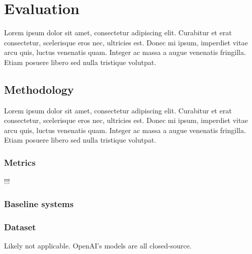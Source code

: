 \chapter{Evaluation}
Lorem ipsum dolor sit amet, consectetur adipiscing elit. Curabitur et erat consectetur, 
scelerisque eros nec, ultricies est. Donec mi ipsum, imperdiet vitae arcu quis, luctus venenatis quam. 
Integer ac massa a augue venenatis fringilla. Etiam posuere libero sed nulla tristique volutpat.

\section{Methodology}
Lorem ipsum dolor sit amet, consectetur adipiscing elit. Curabitur et erat consectetur, 
scelerisque eros nec, ultricies est. Donec mi ipsum, imperdiet vitae arcu quis, luctus venenatis quam. 
Integer ac massa a augue venenatis fringilla. Etiam posuere libero sed nulla tristique volutpat.

\subsection{Metrics}
!!!

\subsection{Baseline systems}

\subsection{Dataset}
Likely not applicable. OpenAI's models are all closed-source.